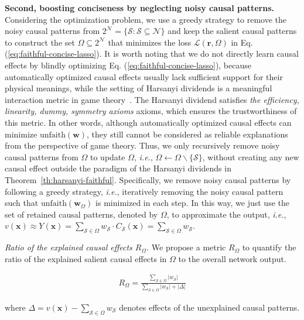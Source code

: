 \documentclass[10pt,twocolumn,letterpaper]{article}
\begin{document}
\textbf{Second, boosting conciseness by neglecting noisy causal patterns.}
Considering the optimization problem, we use a greedy strategy to remove the noisy causal patterns from {\small$2^{\mathcal{N}}=\{\mathcal{S}:\mathcal{S}\subseteq \mathcal{N}\}$} and keep the salient causal patterns to construct the set {\small$\Omega\subseteq 2^{\mathcal{N}}$} that minimizes the loss {\small$\mathcal{L}(\boldsymbol{r},\Omega)$} in Eq. (\ref{eq:faithful-concise-lasso}).
It is worth noting that we do not directly learn causal effects by blindly optimizing Eq. (\ref{eq:faithful-concise-lasso}), because automatically optimized causal effects usually lack sufficient support for their physical meanings, while the setting of Harsanyi dividends is a meaningful interaction metric in game theory~\cite{harsanyi1963simplified}. The Harsanyi dividend satisfies \textit{the efficiency, linearity, dummy, symmetry axioms} axioms, which ensures the trustworthiness of this metric.
In other words, although automatically optimized causal effects can minimize {\small$\mathrm{unfaith}(\boldsymbol{w})$}, they still cannot be considered as reliable explanations from the perspective of game theory.
Thus, we only recursively remove noisy causal patterns from {\small$\Omega$} to update {\small$\Omega$}, \emph{i.e.}, {\small$\Omega \!\leftarrow\! \Omega\backslash \{\mathcal{S}\}$}, without creating any new causal effect outside the paradigm of the Harsanyi dividends in Theorem~\ref{th:harsanyi-faithful}.
Specifically, we remove noisy causal patterns by following a greedy strategy, \emph{i.e.}, iteratively removing the noisy causal pattern such that {\small$\mathrm{unfaith}(\boldsymbol{w}_\Omega)$} is minimized in each step.
In this way, we just use the set of retained causal patterns, denoted by {\small$\Omega$}, to approximate the output, \emph{i.e.}, {\small $v(\boldsymbol{x})\approx Y(\boldsymbol{x})=\sum_{\mathcal{S}\in\Omega}w_{\mathcal{S}}\cdot C_\mathcal{S}(\boldsymbol{x})=\sum_{\mathcal{S}\in\Omega}w_{\mathcal{S}}$}.


\textit{Ratio of the explained causal effects {\small$R_{\Omega}$}.}
We propose a metric {\small$R_{\Omega}$} to quantify the ratio of the explained salient causal effects in {\small$\Omega$} to the overall network output.

\begin{small}
\begin{equation}
\begin{aligned}
     R_{\Omega}=\frac{\sum_{\mathcal{S}\in \Omega} |w_{\mathcal{S}}|}{\sum_{\mathcal{S}\in \Omega}|w_{\mathcal{S}}|+|\Delta|}
\label{eq:explain-ratio}
\end{aligned}
\end{equation}
\end{small}
\!\!where {\small$\Delta\!=\!v(\boldsymbol{x})\!-\!\sum_{\mathcal{S}\in \Omega}\! w_{\mathcal{S}}$} denotes effects of the unexplained causal patterns.
\end{document}
